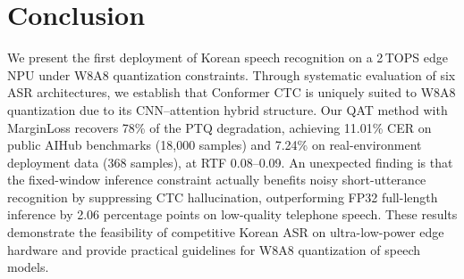 \documentclass[a4paper,11pt,twocolumn]{article}
\begin{document}
\section{Conclusion}

We present the first deployment of Korean speech recognition on a 2\,TOPS edge NPU under W8A8 quantization constraints. Through systematic evaluation of six ASR architectures, we establish that Conformer CTC is uniquely suited to W8A8 quantization due to its CNN--attention hybrid structure. Our QAT method with MarginLoss recovers 78\% of the PTQ degradation, achieving 11.01\% CER on public AIHub benchmarks (18,000 samples) and 7.24\% on real-environment deployment data (368 samples), at RTF 0.08--0.09. An unexpected finding is that the fixed-window inference constraint actually benefits noisy short-utterance recognition by suppressing CTC hallucination, outperforming FP32 full-length inference by 2.06 percentage points on low-quality telephone speech. These results demonstrate the feasibility of competitive Korean ASR on ultra-low-power edge hardware and provide practical guidelines for W8A8 quantization of speech models.
\end{document}
